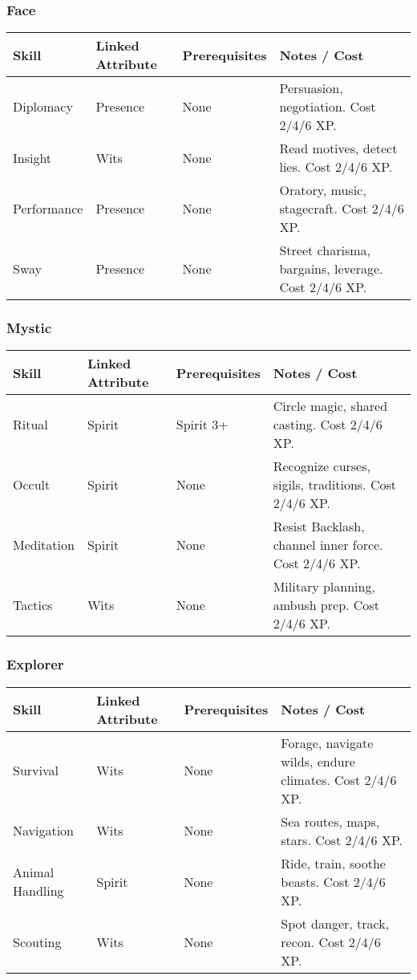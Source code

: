 \documentclass[12pt]{article}
\begin{document}
\subsubsection*{Face}
\begin{tabular}{@{}llll@{}}
\toprule
\textbf{Skill} & \textbf{Linked Attribute} & \textbf{Prerequisites} & \textbf{Notes / Cost} \\
\midrule
Diplomacy & Presence & None & Persuasion, negotiation. Cost 2/4/6 XP. \\
Insight & Wits & None & Read motives, detect lies. Cost 2/4/6 XP. \\
Performance & Presence & None & Oratory, music, stagecraft. Cost 2/4/6 XP. \\
Sway & Presence & None & Street charisma, bargains, leverage. Cost 2/4/6 XP. \\
\bottomrule
\end{tabular}

\subsubsection*{Mystic}
\begin{tabular}{@{}llll@{}}
\toprule
\textbf{Skill} & \textbf{Linked Attribute} & \textbf{Prerequisites} & \textbf{Notes / Cost} \\
\midrule
Ritual & Spirit & Spirit 3+ & Circle magic, shared casting. Cost 2/4/6 XP. \\
Occult & Spirit & None & Recognize curses, sigils, traditions. Cost 2/4/6 XP. \\
Meditation & Spirit & None & Resist Backlash, channel inner force. Cost 2/4/6 XP. \\
Tactics & Wits & None & Military planning, ambush prep. Cost 2/4/6 XP. \\
\bottomrule
\end{tabular}

\subsubsection*{Explorer}
\begin{tabular}{@{}llll@{}}
\toprule
\textbf{Skill} & \textbf{Linked Attribute} & \textbf{Prerequisites} & \textbf{Notes / Cost} \\
\midrule
Survival & Wits & None & Forage, navigate wilds, endure climates. Cost 2/4/6 XP. \\
Navigation & Wits & None & Sea routes, maps, stars. Cost 2/4/6 XP. \\
Animal Handling & Spirit & None & Ride, train, soothe beasts. Cost 2/4/6 XP. \\
Scouting & Wits & None & Spot danger, track, recon. Cost 2/4/6 XP. \\
\bottomrule
\end{tabular}
\end{document}
